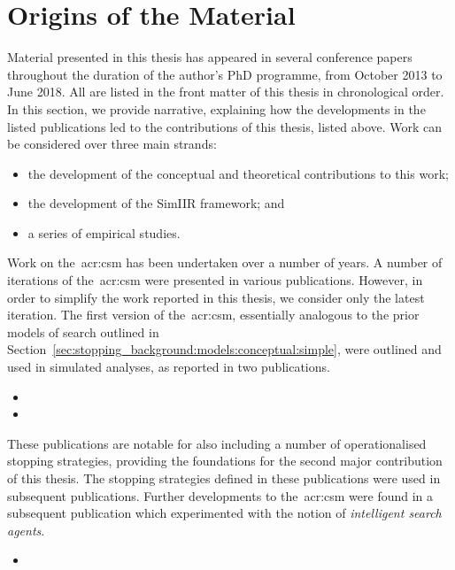 \section{Origins of the Material}
Material presented in this thesis has appeared in several conference papers throughout the duration of the author's PhD programme, from October 2013 to June 2018. All are listed in the front matter of this thesis in chronological order. In this section, we provide narrative, explaining how the developments in the listed publications led to the contributions of this thesis, listed above. Work can be considered over three main strands:

\begin{itemize}
    \item{the development of the conceptual and theoretical contributions to this work;}
    \item{the development of the SimIIR framework; and}
    \item{a series of empirical studies.}
\end{itemize}

\noindent
{}
Work on the~\gls{acr:csm} has been undertaken over a number of years. A number of iterations of the~\gls{acr:csm} were presented in various publications. However, in order to simplify the work reported in this thesis, we consider only the latest iteration. The first version of the~\gls{acr:csm}, essentially analogous to the prior models of search outlined in Section~\ref{sec:stopping_background:models:conceptual:simple}, were outlined and used in simulated analyses, as reported in two publications.

\begin{itemize}
    \item{}
    \item{}
\end{itemize}

These publications are notable for also including a number of operationalised stopping strategies, providing the foundations for the second major contribution of this thesis. The stopping strategies defined in these publications were used in subsequent publications. Further developments to the~\gls{acr:csm} were found in a subsequent publication which experimented with the notion of \emph{intelligent search agents}.

\begin{itemize}
    \item{}
\end{itemize}

